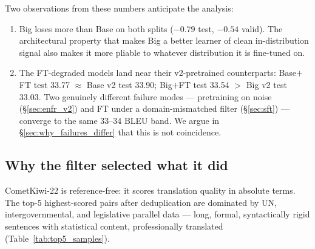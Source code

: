 Two observations from these numbers anticipate the analysis:
\begin{enumerate}
\item Big loses more than Base on both splits ($-0.79$ test, $-0.54$ valid). The architectural property that makes Big a better learner of clean in-distribution signal also makes it more pliable to whatever distribution it is fine-tuned on.
\item The FT-degraded models land near their v2-pretrained counterparts: Base$+$FT test 33.77 $\approx$ Base v2 test 33.90; Big$+$FT test 33.54 $>$ Big v2 test 33.03. Two genuinely different failure modes --- pretraining on noise (\S\ref{sec:enfr_v2}) and FT under a domain-mismatched filter (\S\ref{sec:sft}) --- converge to the same 33--34 BLEU band. We argue in \S\ref{sec:why_failures_differ} that this is not coincidence.
\end{enumerate}

\subsection{Why the filter selected what it did}
CometKiwi-22 is reference-free: it scores translation quality in absolute terms. The top-5 highest-scored pairs after deduplication are dominated by UN, intergovernmental, and legislative parallel data --- long, formal, syntactically rigid sentences with statistical content, professionally translated (Table~\ref{tab:top5_samples}).

